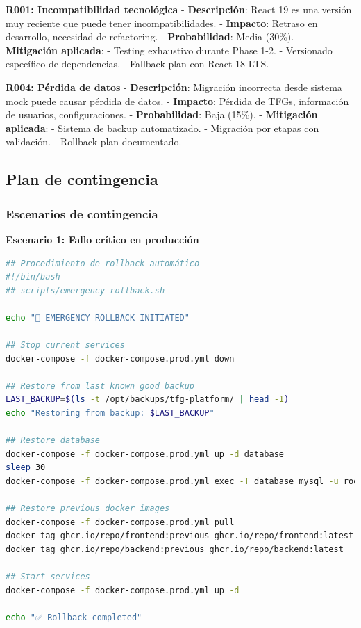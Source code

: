 \documentclass[12pt,a4paper,oneside]{report}
\begin{document}
\textbf{R001: Incompatibilidad tecnológica} - \textbf{Descripción}:
React 19 es una versión muy reciente que puede tener incompatibilidades.
- \textbf{Impacto}: Retraso en desarrollo, necesidad de refactoring. -
\textbf{Probabilidad}: Media (30\%). - \textbf{Mitigación aplicada}: -
Testing exhaustivo durante Phase 1-2. - Versionado específico de
dependencias. - Fallback plan con React 18 LTS.

\textbf{R004: Pérdida de datos} - \textbf{Descripción}: Migración
incorrecta desde sistema mock puede causar pérdida de datos. -
\textbf{Impacto}: Pérdida de TFGs, información de usuarios,
configuraciones. - \textbf{Probabilidad}: Baja (15\%). -
\textbf{Mitigación aplicada}: - Sistema de backup automatizado. -
Migración por etapas con validación. - Rollback plan documentado.

\subsection{Plan de contingencia}\label{plan-de-contingencia}

\subsubsection{Escenarios de
contingencia}\label{escenarios-de-contingencia}

\textbf{Escenario 1: Fallo crítico en producción}

\begin{lstlisting}[language=bash]
## Procedimiento de rollback automático
#!/bin/bash
## scripts/emergency-rollback.sh

echo "🚨 EMERGENCY ROLLBACK INITIATED"

## Stop current services
docker-compose -f docker-compose.prod.yml down

## Restore from last known good backup
LAST_BACKUP=$(ls -t /opt/backups/tfg-platform/ | head -1)
echo "Restoring from backup: $LAST_BACKUP"

## Restore database
docker-compose -f docker-compose.prod.yml up -d database
sleep 30
docker-compose -f docker-compose.prod.yml exec -T database mysql -u root -p$DB_ROOT_PASSWORD tfg_production < /opt/backups/tfg-platform/$LAST_BACKUP/database.sql

## Restore previous docker images
docker-compose -f docker-compose.prod.yml pull
docker tag ghcr.io/repo/frontend:previous ghcr.io/repo/frontend:latest
docker tag ghcr.io/repo/backend:previous ghcr.io/repo/backend:latest

## Start services
docker-compose -f docker-compose.prod.yml up -d

echo "✅ Rollback completed"
\end{lstlisting}
\end{document}
